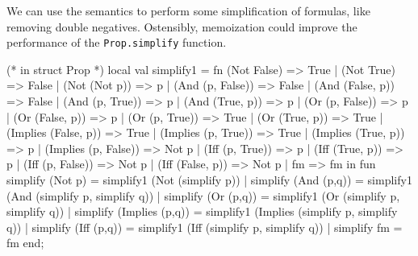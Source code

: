 \begin{node}[Simplification]\label{prop-000Z}%
We can use the semantics to perform some simplification of formulas,
like removing double negatives. Ostensibly, memoization could improve
the performance of the \lstinline[basicstyle=\color{sbase03}\ttfamily\small,language=SML]{Prop.simplify} function.
\begin{sml}
(* in struct Prop *)
local
  val simplify1 =
  fn (Not False) => True
   | (Not True) => False
   | (Not (Not p)) => p
   | (And (p, False)) => False
   | (And (False, p)) => False
   | (And (p, True)) => p
   | (And (True, p)) => p
   | (Or (p, False)) => p
   | (Or (False, p)) => p
   | (Or (p, True)) => True
   | (Or (True, p)) => True
   | (Implies (False, p)) => True
   | (Implies (p, True)) => True
   | (Implies (True, p)) => p
   | (Implies (p, False)) => Not p
   | (Iff (p, True)) => p
   | (Iff (True, p)) => p
   | (Iff (p, False)) => Not p
   | (Iff (False, p)) => Not p
   | fm => fm
in
  fun simplify (Not p) = simplify1 (Not (simplify p))
   |  simplify (And (p,q)) = simplify1 (And (simplify p, simplify q))
   |  simplify (Or (p,q)) = simplify1 (Or (simplify p, simplify q))
   |  simplify (Implies (p,q)) = simplify1 (Implies (simplify p, simplify q))
   |  simplify (Iff (p,q)) = simplify1 (Iff (simplify p, simplify q))
   |  simplify fm = fm
end;
\end{sml}
\end{node}

